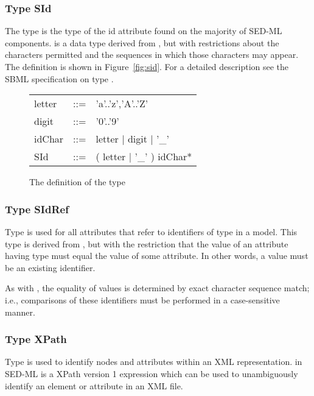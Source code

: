 \subsubsection{Type SId}
\label{type:sid}
The type  is the type of the id attribute found on the majority of SED-ML components.  is a data type derived from , but with restrictions about the characters permitted and the sequences in which those characters may appear. The definition is shown in Figure~\vref{fig:sid}. For a detailed description see the SBML specification on type  \citep{HBH+10}.

\begin{figure}[hbt]
  \ttfamily
  \small
  \centering
  \begin{tabular}{lll}
    letter & ::= & 'a'..'z','A'..'Z'\\
    digit  & ::= & '0'..'9'\\
    idChar & ::= & letter | digit | '\_'\\
    SId    & ::= & ( letter | '\_' ) idChar*\\
  \end{tabular}
  \vspace*{-1ex}
  \caption{The definition of the type }
  \label{fig:sid}
\end{figure}


\subsubsection{Type SIdRef}
\label{type:sidref}
Type  is used for all attributes that refer to identifiers of type \hyperref[type:sid]{} in a model. This type is derived from \hyperref[type:sid]{}, but with the restriction that the value of an attribute having type  must equal the value of some \hyperref[type:sid]{} attribute. In other words, a  value must be an existing identifier.

As with \hyperref[type:sid]{}, the equality of  values is determined by exact character sequence match; i.e., comparisons of these identifiers must be performed in a case-sensitive manner.

\subsubsection{Type XPath}
\label{type:xpath}
Type  is used to identify nodes and attributes within an XML representation.  in SED-ML is a XPath version 1 expression which can be used to unambiguously identify an element or attribute in an XML file.

